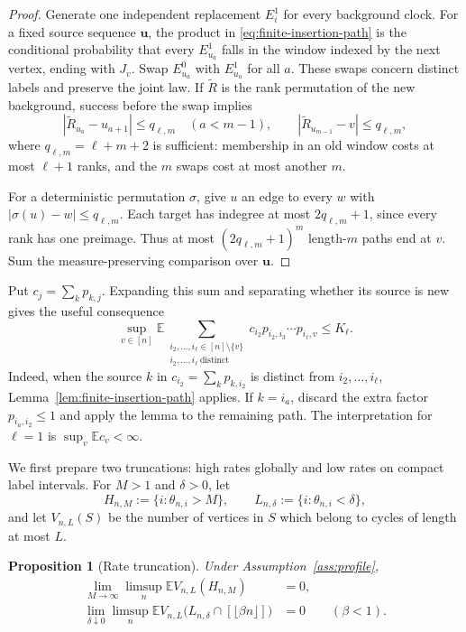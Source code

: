 \documentclass[11pt]{article}
\newtheorem{proposition}[theorem]{Proposition}
\theoremstyle{remark}
\theoremstyle{plain}
\newcommand{\E}{\mathbb E}
\begin{document}
\begin{proof}
Generate one independent replacement $E_i^1$ for every background clock.
For a fixed source sequence $\boldsymbol u$, the product in
\eqref{eq:finite-insertion-path} is the conditional probability that every
$E_{u_a}^1$ falls in the window indexed by the next vertex, ending with
$J_v$.  Swap $E_{u_a}^0$ with $E_{u_a}^1$ for all $a$.  These swaps concern
distinct labels and preserve the joint law.  If $\widetilde R$ is the rank
permutation of the new background, success before the swap implies
\begin{equation}\label{eq:approximate-permutation-path}
 |\widetilde R_{u_a}-u_{a+1}|\le q_{\ell,m}\quad(a<m-1),
 \qquad
 |\widetilde R_{u_{m-1}}-v|\le q_{\ell,m},
\end{equation}
where $q_{\ell,m}=\ell+m+2$ is sufficient: membership in an old window costs
at most $\ell+1$ ranks, and the $m$ swaps cost at most another $m$.

For a deterministic permutation $\sigma$, give $u$ an edge to every $w$ with
$|\sigma(u)-w|\le q_{\ell,m}$.  Each target has indegree at most
$2q_{\ell,m}+1$, since every rank has one preimage.  Thus at most
$(2q_{\ell,m}+1)^m$ length-$m$ paths end at $v$.  Sum the
measure-preserving comparison over $\boldsymbol u$.
\end{proof}

Put $c_j=\sum_kp_{k,j}$.  Expanding this sum and separating whether its source
is new gives the useful consequence
\begin{equation}\label{eq:added-predecessor}
 \sup_{v\in[n]}\E
 \sum_{\substack{i_2,\ldots,i_\ell\in[n]\setminus\{v\}\\
                  i_2,\ldots,i_\ell\ {\mathrm{distinct}}}}
 c_{i_2}p_{i_2,i_3}\cdots p_{i_\ell,v}\le K_\ell.
\end{equation}
Indeed, when the source $k$ in $c_{i_2}=\sum_kp_{k,i_2}$ is distinct from
$i_2,\ldots,i_\ell$, Lemma~\ref{lem:finite-insertion-path} applies.  If
$k=i_a$, discard the extra factor $p_{i_a,i_2}\le1$ and apply the lemma to
the remaining path.  The interpretation for $\ell=1$ is
$\sup_v\E c_v<\infty$.

We first prepare two truncations: high rates globally and low rates on compact
label intervals.  For $M>1$ and $\delta>0$, let
\[
 H_{n,M}:=\{i:\theta_{n,i}>M\},\qquad
 L_{n,\delta}:=\{i:\theta_{n,i}<\delta\},
\]
and let $V_{n,L}(S)$ be the number of vertices in $S$ which belong to cycles
of length at most $L$.

\begin{proposition}[Rate truncation]\label{prop:cycle-rate-truncation}
Under Assumption~\ref{ass:profile},
\begin{align}
 \lim_{M\to\infty}\limsup_n\E V_{n,L}(H_{n,M})&=0,
 \label{eq:high-cycle-truncation}\\
 \lim_{\delta\downarrow0}\limsup_n
 \E V_{n,L}\bigl(L_{n,\delta}\cap[\lfloor\beta n\rfloor]\bigr)&=0
 \qquad(\beta<1).
 \label{eq:compact-low-cycle-truncation}
\end{align}
\end{proposition}
\end{document}
